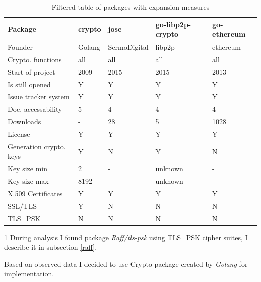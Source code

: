 \documentclass[
  twoside, 12pt, 
  printed, %
  notable,   %
  lof,     %
  lot,     %
]{fithesis3}
\begin{document}
\begin{table}[th]
\caption{Filtered table of packages with expansion measures} 
\begin{threeparttable}
\begin{tabular}{|Q{2.4cm}|Q{1.1cm} Q{2.3cm} Q{2.3cm} Q{2.3cm}|}
\hline \hline
Package & crypto & jose & go-libp2p-crypto & go-ethereum \\ [2ex]
\hline \hline
Founder & Golang & SermoDigital & libp2p & ethereum \\ [2ex]
Crypto. functions & all & all & all & all \\ [3.3ex]
Start of project & 2009 & 2015 & 2015 & 2013 \\ [3.3ex]
Is still opened & Y & Y & Y & Y \\ [3.3ex]
Issue tracker system & Y & Y & Y & Y \\ [3.3ex]
Doc. accessability & 5 & 4 & 4 & 4 \\ [3.3ex]
Downloads & - & 28 & 5 & 1028 \\ [2ex]
License & Y & Y & Y & Y \\ [2ex]
Generation crypto. keys & Y & N & Y & N \\ [3.3ex]
Key size min & 2 & - & unknown & - \\ [3.3ex]
Key size max & 8192 & - & unknown & - \\ [3.3ex]
X.509 Certificates & Y & Y & Y & Y \\ [3.3ex]
SSL/TLS & Y & N & N & N \\ [2ex]
TLS\_PSK  & N & N & N & N \\ [2ex]
\hline
\end{tabular}
\begin{tablenotes}
\item[1] During analysis I found package \textit{Raff/tls-psk} using TLS\_PSK cipher suites, I describe it in subsection \ref{raff}.%
\end{tablenotes}
\end{threeparttable}
\label{table:analysis23} 
\end{table}

\nocite{crypto}
\nocite{jose}
\nocite{libp2p}
\nocite{ethereum}

Based on observed data I decided to use Crypto package created by \textit{Golang} for 
implementation. 
\end{document}
